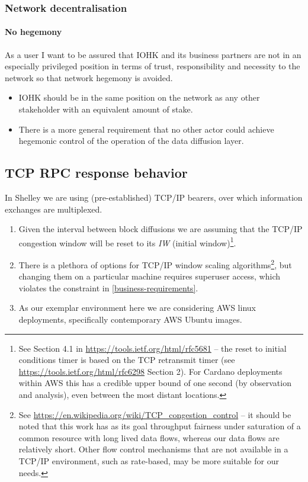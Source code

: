 \documentclass[11pt,a4paper]{article}
\begin{document}
\subsubsection{Network decentralisation}
\label{network-decentralisation}

\paragraph{No hegemony}

As a user I want to be assured that IOHK and its business partners are
not in an especially privileged position in terms of trust,
responsibility and necessity to the network so that network hegemony is
avoided.

\begin{itemize}
\item
  IOHK should be in the same position on the network as any other
  stakeholder with an equivalent amount of stake.
\item
  There is a more general requirement that no other actor could achieve
  hegemonic control of the operation of the data diffusion layer.
\end{itemize}

\subsection{TCP RPC response behavior}
\label{tcp-rpc-response-behavior}

In Shelley we are using (pre-established) TCP/IP bearers, over which
information exchanges are multiplexed.

\begin{enumerate}
\item
  Given the interval between block diffusions we are assuming that the
  TCP/IP congestion window will be reset to its \emph{IW} (initial
  window)\footnote{See Section 4.1 in
    \href{https://tools.ietf.org/html/rfc5681}{{https://tools.ietf.org/html/rfc5681}}
    -- the reset to initial conditions timer is based on the TCP
    retransmit timer (see
    \href{https://tools.ietf.org/html/rfc6298}{{https://tools.ietf.org/html/rfc6298}}
    Section 2). For Cardano deployments within AWS this has a credible upper
    bound of one second (by observation and analysis), even between the
    most distant locations.}.
\item
  There is a plethora of options for TCP/IP window scaling
  algorithms\footnote{See
    \href{https://en.wikipedia.org/wiki/TCP_congestion_control}{{https://en.wikipedia.org/wiki/TCP\_congestion\_control}}
    -- it should be noted that this work has as its goal throughput
    fairness under saturation of a common resource with long lived data
    flows, whereas our data flows are relatively short. Other flow
    control mechanisms that are not available in a TCP/IP environment,
    such as rate-based, may be more suitable for our needs.}, but
  changing them on a particular machine requires superuser access, which
  violates the constraint in \cref{business-requirements}.
\item
  As our exemplar environment here we are considering AWS linux
  deployments, specifically contemporary AWS Ubuntu images.
\end{enumerate}
\end{document}
